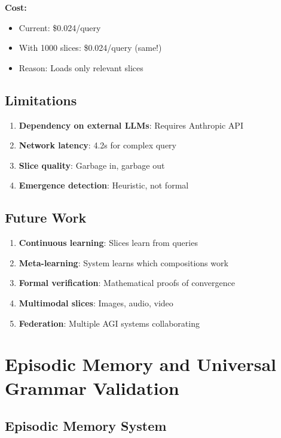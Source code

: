 \documentclass[11pt]{article}
\begin{document}
\textbf{Cost:}
\begin{itemize}
    \item Current: \$0.024/query
    \item With 1000 slices: \$0.024/query (same!)
    \item Reason: Loads only relevant slices
\end{itemize}

\subsection{Limitations}

\begin{enumerate}
    \item \textbf{Dependency on external LLMs}: Requires Anthropic API
    \item \textbf{Network latency}: 4.2s for complex query
    \item \textbf{Slice quality}: Garbage in, garbage out
    \item \textbf{Emergence detection}: Heuristic, not formal
\end{enumerate}

\subsection{Future Work}

\begin{enumerate}
    \item \textbf{Continuous learning}: Slices learn from queries
    \item \textbf{Meta-learning}: System learns which compositions work
    \item \textbf{Formal verification}: Mathematical proofs of convergence
    \item \textbf{Multimodal slices}: Images, audio, video
    \item \textbf{Federation}: Multiple AGI systems collaborating
\end{enumerate}

\section{Episodic Memory and Universal Grammar Validation}

\subsection{Episodic Memory System}
\end{document}

